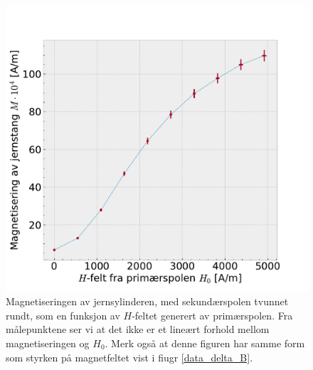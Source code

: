 \documentclass[%
 reprint,
nofootinbib,
aps,
]{revtex4-1}
\begin{document}
\begin{figure}[h!]
  \centering
  \includegraphics[scale=0.45]{magnetisering.pdf}
  \caption{Magnetiseringen av jernsylinderen, med sekundærspolen tvunnet rundt, som en funksjon av $H$-feltet generert av primærspolen. Fra målepunktene ser vi at det ikke er et lineært forhold mellom magnetiseringen og $H_0$. Merk også at denne figuren har samme form som styrken på magnetfeltet vist i fiugr \vref{data_delta_B}.}
  \label{MH0}
\end{figure}
\end{document}
